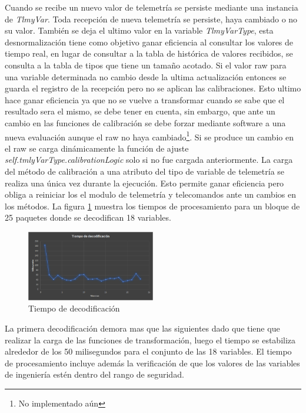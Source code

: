 \documentclass[twoside,twocolumn]{article}
\begin{document}
Cuando se recibe un nuevo valor de telemetría se persiste mediante una instancia de \textit{TlmyVar}. Toda recepción de nueva telemetría se persiste, haya cambiado o no su valor. También se deja el ultimo valor en la variable \textit{TlmyVarType}, esta desnormalización tiene como objetivo ganar eficiencia al consultar los valores de tiempo real, en lugar de consultar a la tabla de histórica de valores recibidos, se consulta a la tabla de tipos que tiene un tamaño acotado. Si el valor raw para una variable determinada no cambio desde la ultima actualización entonces se guarda el registro de la recepción pero no se aplican las calibraciones. Esto ultimo hace ganar eficiencia ya que no se vuelve a transformar cuando se sabe que el resultado sera el mismo, se debe tener en cuenta, sin embargo, que ante un cambio en las funciones de calibración se debe forzar mediante software a una nueva evaluación aunque el raw no haya cambiado\footnote{No implementado aún}.
Si se produce un cambio en el raw se carga dinámicamente la función de ajuste \textit{self.tmlyVarType.calibrationLogic} solo si no fue cargada anteriormente. La carga del método de calibración a una atributo del tipo de variable de telemetría se realiza una única vez durante la ejecución. Esto permite ganar eficiencia pero obliga a reiniciar los el modulo de telemetría y telecomandos ante un cambios en los métodos. La figura \ref{fig:TiempoDecodificacion} muestra los tiempos de procesamiento para un bloque de 25 paquetes donde se decodifican 18 variables.

\begin{figure}[]
  \caption{Tiempo de decodificación}
  \label{fig:TiempoDecodificacion}
  \centering
  \includegraphics[width=0.5\textwidth]{Imagenes/tiempoDecodificacion.png}
\end{figure}

La primera decodificación demora mas que las siguientes dado que tiene que realizar la carga de las funciones de transformación, luego el tiempo se estabiliza alrededor de los 50 milisegundos para el conjunto de las 18 variables. El tiempo de procesamiento incluye además la verificación de que los valores de las variables de ingeniería estén dentro del rango de seguridad.
\end{document}
